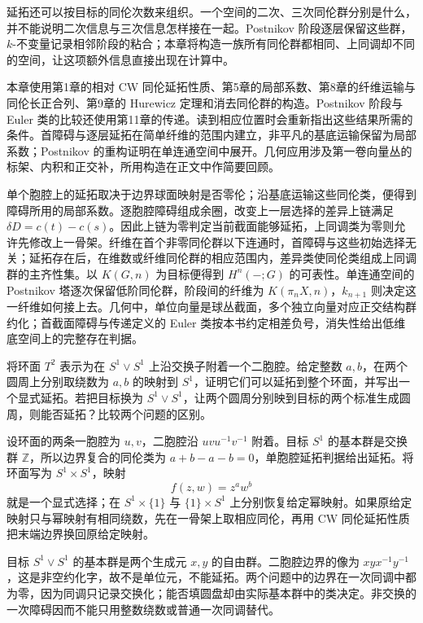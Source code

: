 \ProseParagraphBreak

延拓还可以按目标的同伦次数来组织。一个空间的二次、三次同伦群分别是什么，并不能说明二次信息与三次信息怎样接在一起。Postnikov 阶段逐层保留这些群，\(k\)-不变量记录相邻阶段的粘合；本章将构造一族所有同伦群都相同、上同调却不同的空间，让这项额外信息直接出现在计算中。

\ProseParagraphBreak

本章使用第1章的相对 CW 同伦延拓性质、第5章的局部系数、第8章的纤维运输与同伦长正合列、第9章的 Hurewicz 定理和消去同伦群的构造。Postnikov 阶段与 Euler 类的比较还使用第11章的传递。读到相应位置时会重新指出这些结果所需的条件。首障碍与逐层延拓在简单纤维的范围内建立，非平凡的基底运输保留为局部系数；Postnikov 的重构证明在单连通空间中展开。几何应用涉及第一卷向量丛的标架、内积和正交补，所用构造在正文中作简要回顾。






\begin{chaptersummary}
	单个胞腔上的延拓取决于边界球面映射是否零伦；沿基底运输这些同伦类，便得到障碍所用的局部系数。逐胞腔障碍组成余圈，改变上一层选择的差异上链满足 \(\delta D=c(t)-c(s)\)。因此上链为零判定当前截面能够延拓，上同调类为零则允许先修改上一骨架。纤维在首个非零同伦群以下连通时，首障碍与这些初始选择无关；延拓存在后，在维数或纤维同伦群的相应范围内，差异类使同伦类组成上同调群的主齐性集。以 \(K(G,n)\) 为目标便得到 \(H^n(-;G)\) 的可表性。单连通空间的 Postnikov 塔逐次保留低阶同伦群，阶段间的纤维为 \(K(\pi_nX,n)\)，\(k_{n+1}\) 则决定这一纤维如何接上去。几何中，单位向量是球丛截面，多个独立向量对应正交结构群约化；首截面障碍与传递定义的 Euler 类按本书约定相差负号，消失性给出低维底空间上的完整存在判据。
\end{chaptersummary}

\BookExercises

\begin{exercise}\label{g2:ex:torus-extension-commutator}
	将环面 \(T^2\) 表示为在 \(S^1\vee S^1\) 上沿交换子附着一个二胞腔。给定整数 \(a,b\)，在两个圆周上分别取绕数为 \(a,b\) 的映射到 \(S^1\)，证明它们可以延拓到整个环面，并写出一个显式延拓。若把目标换为 \(S^1\vee S^1\)，让两个圆周分别映到目标的两个标准生成圆周，则能否延拓？比较两个问题的区别。
\end{exercise}
\begin{solution}
	设环面的两条一胞腔为 \(u,v\)，二胞腔沿 \(uvu^{-1}v^{-1}\) 附着。目标 \(S^1\) 的基本群是交换群 \(\mathbb Z\)，所以边界复合的同伦类为 \(a+b-a-b=0\)，单胞腔延拓判据给出延拓。将环面写为 \(S^1\times S^1\)，映射
	\[
		f(z,w)=z^a w^b
	\]
	就是一个显式选择；在 \(S^1\times\{1\}\) 与 \(\{1\}\times S^1\) 上分别恢复给定幂映射。如果原给定映射只与幂映射有相同绕数，先在一骨架上取相应同伦，再用 CW 同伦延拓性质把末端边界换回原给定映射。

	目标 \(S^1\vee S^1\) 的基本群是两个生成元 \(x,y\) 的自由群。二胞腔边界的像为 \(xyx^{-1}y^{-1}\)，这是非空约化字，故不是单位元，不能延拓。两个问题中的边界在一次同调中都为零，因为同调只记录交换化；能否填圆盘却由实际基本群中的类决定。非交换的一次障碍因而不能只用整数绕数或普通一次同调替代。
\end{solution}

